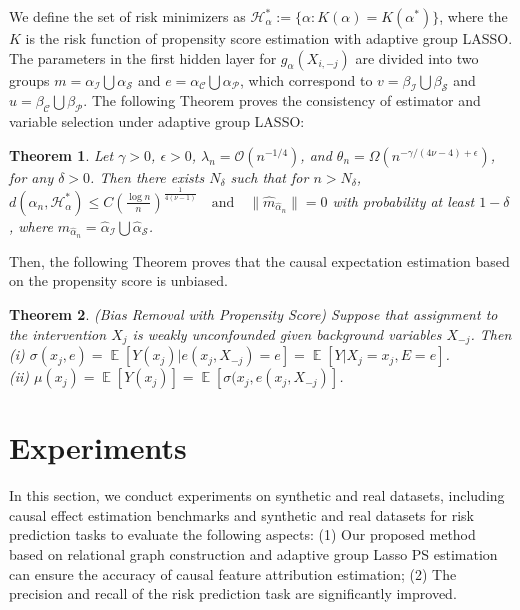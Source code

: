 \documentclass[letterpaper]{article} %
\newcommand{\mc}{\mathcal}
\DeclareMathOperator{\E}{\mathbb{E}}
\newtheorem{theorem}{Theorem}
\theoremstyle{definition}
\theoremstyle{remark}
\begin{document}
We define the set of risk minimizers as
$\mc{H}^*_{\alpha}:= \{\alpha: K(\alpha) = K(\alpha^*)\}$, where the $K$ is the risk function of propensity score estimation with adaptive group LASSO. The parameters in the first hidden layer for $g_\alpha(X_{i,-j})$ are divided into two groups $ m =  \alpha_\mathcal{I} \bigcup  \alpha_\mathcal{S}$ and $ e=  \alpha_\mathcal{C} \bigcup  \alpha_\mathcal{P}$, which correspond to $v = \beta_\mathcal{I} \bigcup \beta_\mathcal{S}$ and $u = \beta_\mathcal{C} \bigcup \beta_\mathcal{P}$. The following Theorem proves the consistency of estimator and variable selection under adaptive group LASSO:
\begin{theorem}
Let $\gamma>0$, $\epsilon>0$, $\lambda_n = \mathcal{O}(n^{-1/4})$, and $\theta_n =\Omega (n^{-\gamma/(4\nu -4)+ \epsilon})$, for any $\delta >0$. Then there exists $N_\delta$ such that for $n > N_\delta$, $d(\hat \alpha_n, \mc{H^*_{\alpha}})  \le C \left( \frac{\log n}{n}\right)^{\frac{1}{4(\nu-1)}} \quad \text{and} \quad
\|\hat{m}_{\hat \alpha_n}\| = 0$ with probability at least $1 -\delta$, where $\hat{m}_{\hat \alpha_n} = \hat{\alpha}_\mathcal{I} \bigcup \hat{\alpha}_\mathcal{S}$.
\label{thm:main}
\end{theorem}

Then, the following Theorem proves that the causal expectation estimation based on the propensity score is unbiased.

\begin{theorem}
\label{thm:bigtheorem}
(Bias Removal with Propensity Score) Suppose that
assignment to the intervention $X_j$ is weakly unconfounded given background variables $X_{-j}$. Then \\
(i) $\sigma(x_j, e) = \E[Y(x_j)|e(x_j, X_{-j}) = e] = \E[Y|X_j = x_j,E = e]$. \\
(ii) $\mu(x_j) = \E[Y(x_j)] = \E[\sigma(x_j, e(x_j, X_{-j})]$.
\end{theorem}


\section{Experiments}

In this section, we conduct experiments on synthetic and real datasets, including causal effect estimation benchmarks and synthetic and real datasets for risk prediction tasks to evaluate the following aspects: (1) Our proposed method based on relational graph construction and adaptive group Lasso PS estimation can ensure the accuracy of causal feature attribution estimation; (2) The precision and recall of the risk prediction task are significantly improved.
\end{document}

